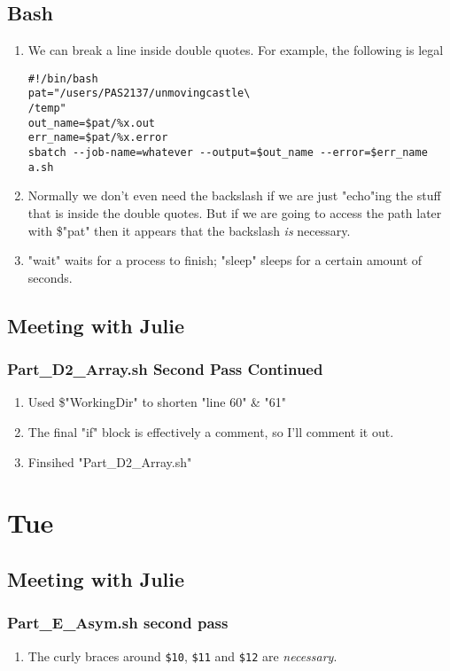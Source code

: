\documentclass[12pt,letterpaper]{article}
\begin{document}
\subsection{Bash}
\begin{enumerate}
  \item We can break a line inside double quotes. For example, the following is legal
    \begin{verbatim}
#!/bin/bash
pat="/users/PAS2137/unmovingcastle\
/temp"
out_name=$pat/%x.out
err_name=$pat/%x.error
sbatch --job-name=whatever --output=$out_name --error=$err_name a.sh
    \end{verbatim}
  \item Normally we don't even need the backslash if we are just "echo"ing the stuff
    that is inside the double quotes. But if we are going to access the path later with
    \$"pat" then it appears that the backslash \textit{is} necessary.
  \item "wait" waits for a process to finish;
    "sleep" sleeps for a certain amount of seconds.
\end{enumerate}
\subsection{Meeting with Julie}
\subsubsection{Part\_D2\_Array.sh Second Pass Continued}
\begin{enumerate}
  \item Used \$"WorkingDir" to shorten "line 60" \& "61"
  \item The final "if" block is effectively a comment, so I'll comment it out.
  \item Finsihed "Part_D2_Array.sh"
\end{enumerate}

\section{Tue}
\subsection{Meeting with Julie}
\subsubsection{Part\_E\_Asym.sh second pass}
\begin{enumerate}
  \item The curly braces around \texttt{\$10}, \texttt{\$11} and \texttt{\$12}
    are \textit{necessary}.
\end{enumerate}
\end{document}
